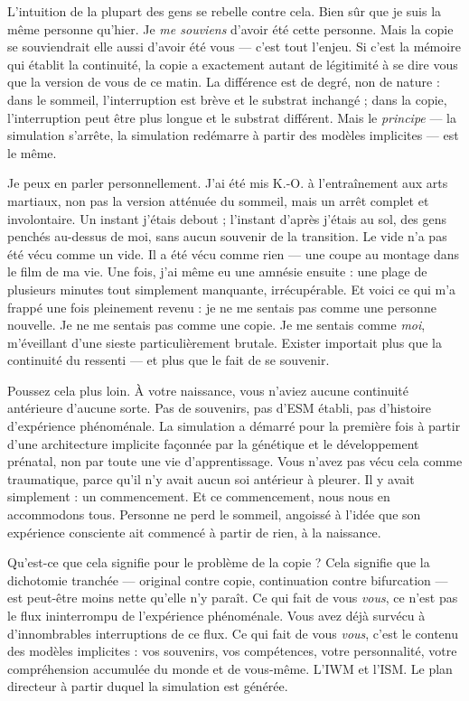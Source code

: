 \documentclass[11pt, twoside, openright]{book}
\begin{document}
L'intuition de la plupart des gens se rebelle contre cela. Bien sûr que je suis la même personne qu'hier. Je \textit{me souviens} d'avoir été cette personne. Mais la copie se souviendrait elle aussi d'avoir été vous --- c'est tout l'enjeu. Si c'est la mémoire qui établit la continuité, la copie a exactement autant de légitimité à se dire vous que la version de vous de ce matin. La différence est de degré, non de nature : dans le sommeil, l'interruption est brève et le substrat inchangé ; dans la copie, l'interruption peut être plus longue et le substrat différent. Mais le \textit{principe} --- la simulation s'arrête, la simulation redémarre à partir des modèles implicites --- est le même.

Je peux en parler personnellement. J'ai été mis K.-O. à l'entraînement aux arts martiaux, non pas la version atténuée du sommeil, mais un arrêt complet et involontaire. Un instant j'étais debout ; l'instant d'après j'étais au sol, des gens penchés au-dessus de moi, sans aucun souvenir de la transition. Le vide n'a pas été vécu comme un vide. Il a été vécu comme rien --- une coupe au montage dans le film de ma vie. Une fois, j'ai même eu une amnésie ensuite : une plage de plusieurs minutes tout simplement manquante, irrécupérable. Et voici ce qui m'a frappé une fois pleinement revenu : je ne me sentais pas comme une personne nouvelle. Je ne me sentais pas comme une copie. Je me sentais comme \textit{moi}, m'éveillant d'une sieste particulièrement brutale. Exister importait plus que la continuité du ressenti --- et plus que le fait de se souvenir.

Poussez cela plus loin. À votre naissance, vous n'aviez aucune continuité antérieure d'aucune sorte. Pas de souvenirs, pas d'ESM établi, pas d'histoire d'expérience phénoménale. La simulation a démarré pour la première fois à partir d'une architecture implicite façonnée par la génétique et le développement prénatal, non par toute une vie d'apprentissage. Vous n'avez pas vécu cela comme traumatique, parce qu'il n'y avait aucun soi antérieur à pleurer. Il y avait simplement : un commencement. Et ce commencement, nous nous en accommodons tous. Personne ne perd le sommeil, angoissé à l'idée que son expérience consciente ait commencé à partir de rien, à la naissance.

Qu'est-ce que cela signifie pour le problème de la copie ? Cela signifie que la dichotomie tranchée --- original contre copie, continuation contre bifurcation --- est peut-être moins nette qu'elle n'y paraît. Ce qui fait de vous \textit{vous}, ce n'est pas le flux ininterrompu de l'expérience phénoménale. Vous avez déjà survécu à d'innombrables interruptions de ce flux. Ce qui fait de vous \textit{vous}, c'est le contenu des modèles implicites : vos souvenirs, vos compétences, votre personnalité, votre compréhension accumulée du monde et de vous-même. L'IWM et l'ISM. Le plan directeur à partir duquel la simulation est générée.
\end{document}
